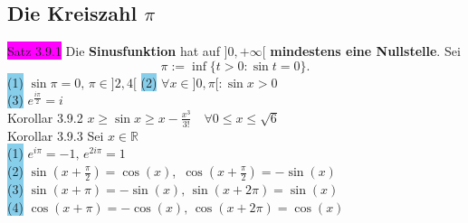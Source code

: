 \documentclass[landscape, 10pt]{article}
\newcommand{\R}{\mathbb{R}}
\begin{document}
\begin{multicols}{3}
       \subsection{Die Kreiszahl $\pi$}
              \colorbox{magenta}{Satz 3.9.1} 
                     Die \textbf{Sinusfunktion} hat auf 
                     \textcolor{NavyBlue}{$]0,+\infty[$}
                     \textbf{mindestens eine Nullstelle}. Sei 
                     \begin{equation*}
                            \pi:=\inf\{t>0:\sin t=0\}.
                     \end{equation*}
                     \colorbox{SkyBlue}{(1)} 
                            \textcolor{NavyBlue}{
                            $\sin\pi=0,\,\pi\in]2,4[$} \qquad
                     \colorbox{SkyBlue}{(2)} 
                            \textcolor{NavyBlue}{
                            $\forall x\in]0,\pi[:\sin x>0$}\\
                     \colorbox{SkyBlue}{(3)} 
                            \textcolor{NavyBlue}{
                            $e^{\frac{i\pi}{2}}=i$}\\
              \colorbox{BurntOrange}{Korollar 3.9.2} 
                     \textcolor{NavyBlue}{
                     $x\geqslant\sin x\geqslant 
                     x-\frac{x^3}{3!}\quad
                     \forall0\leqslant x\leqslant\sqrt{6}$}\\
              \colorbox{BurntOrange}{Korollar 3.9.3}
                     Sei \textcolor{NavyBlue}{$x\in\R$}\\
                     \colorbox{SkyBlue}{(1)} 
                            \textcolor{NavyBlue}{
                            $e^{i\pi}=-1,\,e^{2i\pi}=1$}\\ 
                     \colorbox{SkyBlue}{(2)} 
                            \textcolor{NavyBlue}{
                            $\sin(x+\frac{\pi}{2})=\cos(x)$},\,
                            \textcolor{NavyBlue}{
                            $\cos(x+\frac{\pi}{2})=-\sin(x)$}\\ 
                     \colorbox{SkyBlue}{(3)} 
                            \textcolor{NavyBlue}{
                            $\sin(x+\pi)=-\sin(x),\,
                            \sin(x+2\pi)=\sin(x)$}\\
                     \colorbox{SkyBlue}{(4)}
                            \textcolor{NavyBlue}{
                            $\cos(x+\pi)=-\cos(x),\,
                            \cos(x+2\pi)=\cos(x)$}\\

\end{multicols}
\end{document}
